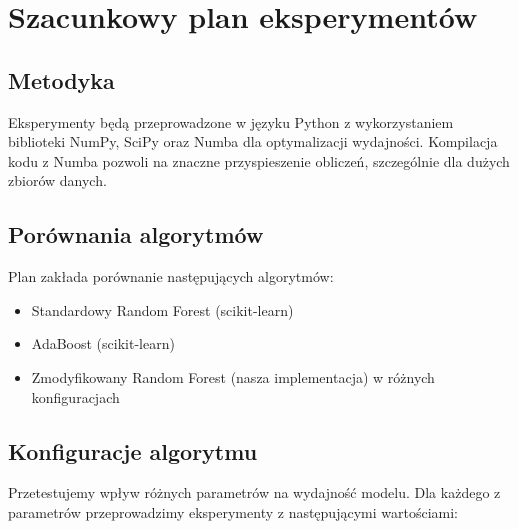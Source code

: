 \documentclass[11pt,a4paper]{article}
\begin{document}
\section{Szacunkowy plan eksperymentów}

\subsection{Metodyka}

Eksperymenty będą przeprowadzone w języku Python z wykorzystaniem biblioteki NumPy, SciPy oraz Numba dla optymalizacji wydajności. Kompilacja kodu z Numba pozwoli na znaczne przyspieszenie obliczeń, szczególnie dla dużych zbiorów danych.





\subsection{Porównania algorytmów}

Plan zakłada porównanie następujących algorytmów:
\begin{itemize}
    \item Standardowy Random Forest (scikit-learn)
    \item AdaBoost (scikit-learn)
    \item Zmodyfikowany Random Forest (nasza implementacja) w różnych konfiguracjach
\end{itemize}

\subsection{Konfiguracje algorytmu}

Przetestujemy wpływ różnych parametrów na wydajność modelu. Dla każdego z parametrów przeprowadzimy eksperymenty z następującymi wartościami:
\end{document}
